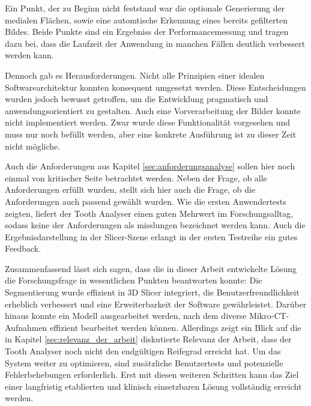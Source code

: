 Ein Punkt, der zu Beginn nicht feststand war die optionale Generierung der medialen
Flächen, sowie eine automtische Erkennung eines bereits gefilterten Bildes. Beide
Punkte sind ein Ergebniss der Performancemessung und tragen dazu bei, dass die
Laufzeit der Anwendung in manchen Fällen deutlich verbessert werden kann.

Dennoch gab es Herausforderungen. Nicht alle Prinzipien einer idealen Softwarearchitektur
konnten konsequent umgesetzt werden. Diese Entscheidungen wurden jedoch bewusst
getroffen, um die Entwicklung pragmatisch und anwendungsorientiert zu gestalten.
Auch eine Vorverarbeitung der Bilder konnte nicht implementiert werden. Zwar wurde
diese Funktionalität vorgesehen und muss nur noch befüllt werden, aber eine
konkrete Ausführung ist zu dieser Zeit nicht mögliche.

Auch die Anforderungen aus Kapitel \ref{sec:anforderungsanalyse} sollen hier
noch einmal von kritischer Seite betrachtet werden. Neben der Frage, ob alle
Anforderungen erfüllt wurden, stellt sich hier auch die Frage, ob die
Anforderungen auch passend gewählt wurden. Wie die ersten Anwendertests zeigten,
liefert der Tooth Analyser einen guten Mehrwert im Forschungsalltag, sodass keine
der Anforderungen als misslungen bezeichnet werden kann. Auch die
Ergebnisdarstellung in der Slicer-Szene erlangt in der ersten Testreihe ein
gutes Feedback.

Zusammenfassend lässt sich sagen, dass die in dieser Arbeit entwickelte Lösung die
Forschungsfrage in wesentlichen Punkten beantworten konnte: Die Segmentierung
wurde effizient in 3D Slicer integriert, die Benutzerfreundlichkeit erheblich verbessert
und eine Erweiterbarkeit der Software gewährleistet. Darüber hinaus konnte ein
Modell ausgearbeitet werden, nach dem diverse Mikro-CT-Aufnahmen effizient bearbeitet
werden können. Allerdings zeigt ein Blick auf die in Kapitel
\ref{sec:relevanz_der_arbeit} diskutierte Relevanz der Arbeit, dass der Tooth Analyser
noch nicht den endgültigen Reifegrad erreicht hat. Um das System weiter zu
optimieren, sind zusätzliche Benutzertests und potenzielle Fehlerbehebungen erforderlich.
Erst mit diesen weiteren Schritten kann das Ziel einer langfristig etablierten
und klinisch einsetzbaren Lösung vollständig erreicht werden.

